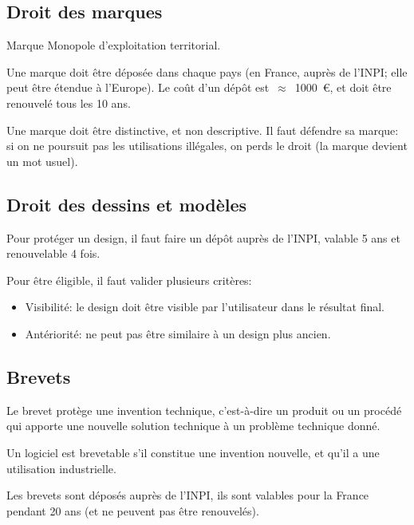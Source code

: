 \documentclass[10pt,a4paper,french]{article}
\begin{document}
\subsection{Droit des marques}

\begin{cquote}{Marque}
Monopole d'exploitation territorial.
\end{cquote}

Une marque doit être déposée dans chaque pays (en France, auprès de l'INPI; elle peut être étendue à l'Europe). Le coût d'un dépôt est~$\approx$~1000~\euro, et doit être renouvelé tous les 10 ans.

Une marque doit être distinctive, et non descriptive. Il faut défendre sa marque: si on ne poursuit pas les utilisations illégales, on perds le droit (la marque devient un mot usuel).

\subsection{Droit des dessins et modèles}

Pour protéger un design, il faut faire un dépôt auprès de l'INPI, valable 5 ans et renouvelable 4 fois.

Pour être éligible, il faut valider plusieurs critères:
\begin{itemize}
\item Visibilité: le design doit être visible par l'utilisateur dans le résultat final.
\item Antériorité: ne peut pas être similaire à un design plus ancien.
\end{itemize}

\subsection{Brevets}

\begin{cquote}{}
Le brevet protège une invention technique, c'est-à-dire un produit ou un procédé qui apporte une nouvelle solution technique à un problème technique donné.
\end{cquote}

Un logiciel est brevetable s'il constitue une invention nouvelle, et qu'il a une utilisation industrielle.

Les brevets sont déposés auprès de l'INPI, ils sont valables pour la France pendant 20 ans (et ne peuvent pas être renouvelés).
\end{document}
